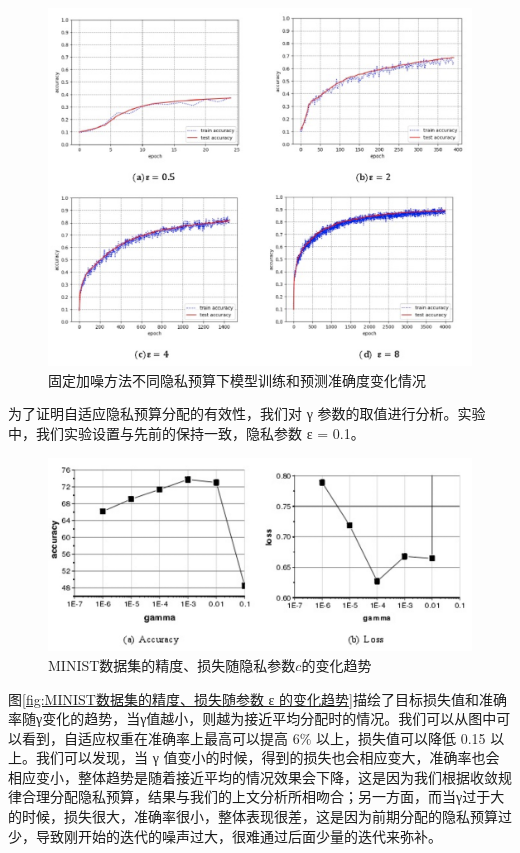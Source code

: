\begin{figure}[!hbt]
\centering
  	\includegraphics[scale=0.6]{fig2/C5/不同梯度剪裁}%
	\caption{固定加噪方法不同隐私预算下模型训练和预测准确度变化情况}
  	\label{fig:固定加噪方法不同隐私预算下模型训练和预测准确度随训练轮数变化情况 
} 
\end{figure}

为了证明自适应隐私预算分配的有效性，我们对 γ 参数的取值进行分析。实验中，我们实验设置与先前的保持一致，隐私参数 ε = 0.1。

\begin{figure}[!hbt]
\centering
  	\includegraphics[scale=0.6]{fig2/C5/minist实验}%
	\caption{MINIST数据集的精度、损失随隐私参数$c$的变化趋势}
  	\label{fig:MINIST数据集的精度、损失随参数$c$的变化趋势} 
\end{figure}

图\ref{fig:MINIST数据集的精度、损失随参数 ε 的变化趋势}描绘了目标损失值和准确率随γ变化的趋势，当γ值越小，则越为接近平均分配时的情况。我们可以从图中可以看到，自适应权重在准确率上最高可以提高 6$\%$ 以上，损失值可以降低 0.15 以上。我们可以发现，当 γ 值变小的时候，得到的损失也会相应变大，准确率也会相应变小，整体趋势是随着接近平均的情况效果会下降，这是因为我们根据收敛规律合理分配隐私预算，结果与我们的上文分析所相吻合；另一方面，而当γ过于大的时候，损失很大，准确率很小，整体表现很差，这是因为前期分配的隐私预算过少，导致刚开始的迭代的噪声过大，很难通过后面少量的迭代来弥补。

